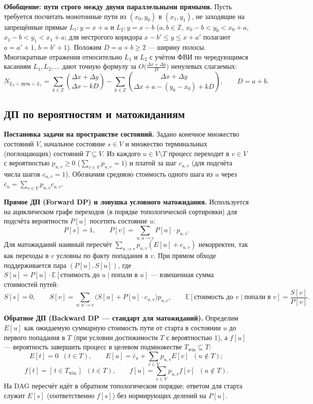 \documentclass[10pt,a4paper]{article}
\renewcommand{\le}{\leqslant}
\renewcommand{\ge}{\geqslant}
\newcommand{\Z}{\mathbb{Z}}
\newcommand{\E}{\mathbb{E}}
\newcommand{\iverson}[1]{[\,#1\,]}
\begin{document}
\textbf{Обобщение: пути строго между двумя параллельными прямыми.} Пусть требуется посчитать монотонные пути из $(x_0, y_0)$ в $(x_1, y_1)$, не заходящие на запрещённые прямые $L_1 : y = x + a$ и $L_2 : y = x - b$ ($a, b \in \Z$, $x_0 - b < y_0 < x_0 + a$, $x_1 - b < y_1 < x_1 + a$; для нестрогого коридора $x - b' \le y \le x + a'$ полагают $a = a' + 1$, $b = b' + 1$). Положим $D = a + b \ge 2$ — ширину полосы. Многократные отражения относительно $L_1$ и $L_2$ с учётом ФВИ по чередующимся касаниям $L_1, L_2, \dots$ дают точную формулу за $O\bigl(\frac{\Delta x + \Delta y}{D}\bigr)$ ненулевых слагаемых:
\[
  N_{L_2 < \text{путь} < L_1} = \sum_{k \in \Z} \binom{\Delta x + \Delta y}{\Delta x - kD} - \sum_{k \in \Z} \binom{\Delta x + \Delta y}{\Delta x + a - (y_0 - x_0) + kD}, \qquad D = a + b.
\]

\subsection{ДП по вероятностям и матожиданиям}

\textbf{Постановка задачи на пространстве состояний.} Задано конечное множество состояний $V$, начальное состояние $s \in V$ и множество терминальных (поглощающих) состояний $T \subseteq V$. Из каждого $u \in V \setminus T$ процесс переходит в $v \in V$ с вероятностью $p_{u,v} \ge 0$ ($\sum_{v \in V} p_{u,v} = 1$) и платой за шаг $c_{u,v}$ (для подсчёта числа шагов $c_{u,v} = 1$). Обозначим среднюю стоимость одного шага из $u$ через $\bar{c}_u = \sum_{v \in V} p_{u,v} c_{u,v}$.

\textbf{Прямое ДП (Forward DP) и ловушка условного матожидания.} Используется на ациклическом графе переходов (в порядке топологической сортировки) для подсчёта вероятности $P[u]$ посетить состояние $u$:
\[
  P[s] = 1, \qquad P[v] = \sum_{u : u \to v} P[u] \cdot p_{u,v}.
\]
Для матожиданий наивный пересчёт $\sum_{u \to v} p_{u,v}(E[u] + c_{u,v})$ некорректен, так как переходы в $v$ условны по факту попадания в $v$. При прямом обходе поддерживается пара $(P[u], S[u])$, где $S[u] = P[u] \cdot \E[\text{стоимость до } u \mid \text{попали в } u]$ — взвешенная сумма стоимостей путей:
\[
  S[s] = 0, \qquad S[v] = \sum_{u : u \to v} \bigl(S[u] + P[u] \cdot c_{u,v}\bigr) p_{u,v}, \qquad
  \E[\text{стоимость до } v \mid \text{попали в } v] = \frac{S[v]}{P[v]}.
\]

\textbf{Обратное ДП (Backward DP — стандарт для матожиданий).} Определим $E[u]$ как ожидаемую суммарную стоимость пути от старта в состоянии $u$ до первого попадания в $T$ (при условии достижимости $T$ с вероятностью $1$), а $f[u]$ — вероятность завершить процесс в целевом подмножестве $T_{\text{win}} \subseteq T$:
\[
  E[t] = 0 \;\; (t \in T), \qquad E[u] = \bar{c}_u + \sum_{v \in V} p_{u,v} E[v] \;\; (u \notin T);
\]
\[
  f[t] = \iverson{t \in T_{\text{win}}} \;\; (t \in T), \qquad f[u] = \sum_{v \in V} p_{u,v} f[v] \;\; (u \notin T).
\]
На DAG пересчёт идёт в обратном топологическом порядке; ответом для старта служит $E[s]$ (соответственно $f[s]$) без нормирующих делений на $P[u]$.
\end{document}
